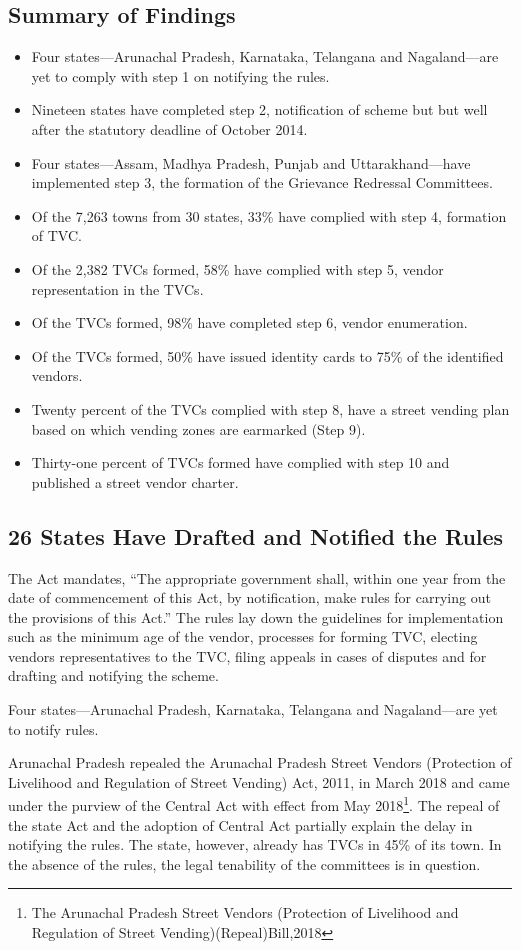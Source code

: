 \documentclass[a4paper, 12pt, twoside]{article}
\begin{document}
\subsection{Summary of Findings}
\begin{itemize}
	\item Four states—Arunachal Pradesh, Karnataka, Telangana and Nagaland—are yet to comply with step 1 on notifying the rules.
	\item Nineteen states have completed step 2, notification of scheme but but well after the statutory deadline of October 2014.
	\item Four states—Assam, Madhya Pradesh, Punjab and Uttarakhand—have implemented step 3, the formation of the Grievance Redressal Committees.
	\item Of the 7,263 towns from 30 states, 33\% have complied with step 4, formation of TVC.
	\item Of the 2,382 TVCs formed, 58\% have complied with step 5, vendor representation in the TVCs.
	\item Of the TVCs formed, 98\% have completed step 6, vendor enumeration.
	\item Of the TVCs formed, 50\% have issued identity cards to 75\% of the identified vendors.
	\item Twenty percent of the TVCs complied with step 8, have a street vending plan based on which vending zones are earmarked (Step 9).
	\item Thirty-one percent of TVCs formed have complied with step 10 and published a street vendor charter.
\end{itemize}

\subsection{26 States Have Drafted and Notified the Rules}	
	The Act mandates, “The appropriate government shall, within one year from the date of commencement of this Act, by notification, make rules for carrying out the provisions of this Act.” The rules lay down the guidelines for implementation such as the minimum age of the vendor, processes for forming TVC, electing vendors representatives to the TVC, filing appeals in cases of disputes and for drafting and notifying the scheme.

	Four states—Arunachal Pradesh, Karnataka, Telangana and Nagaland—are yet to notify rules.

	Arunachal Pradesh repealed the Arunachal Pradesh Street Vendors (Protection of Livelihood and Regulation of Street Vending) Act, 2011, in March 2018 and came under the purview of the Central Act with effect from May 2018\footnote{The Arunachal Pradesh Street Vendors (Protection of Livelihood and Regulation of Street Vending)(Repeal)Bill,2018}. The repeal of the state Act and the adoption of Central Act partially explain the delay in notifying the rules. The state, however, already has TVCs in 45\% of its town. In the absence of the rules, the legal tenability of the committees is in question.
\end{document}
